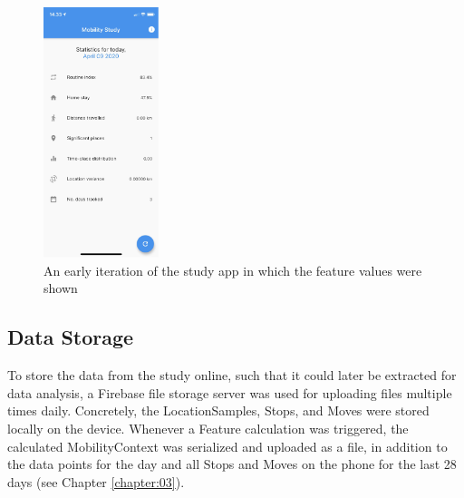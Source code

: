 \begin{figure}
    \centering
    \includegraphics[width=0.3\textwidth]{images/app_imgs/screens-features.pdf}
    \caption{An early iteration of the study app in which the feature values were shown}
    \label{fig:app-features-screen}
\end{figure}

\subsection{Data Storage}
To store the data from the study online, such that it could later be extracted for data analysis, a Firebase file storage server was used for uploading files multiple times daily. Concretely, the LocationSamples, Stops, and Moves were stored locally on the device. Whenever a Feature calculation was triggered, the calculated MobilityContext was serialized and uploaded as a file, in addition to the data points for the day and all Stops and Moves on the phone for the last 28 days (see Chapter \ref{chapter:03}).